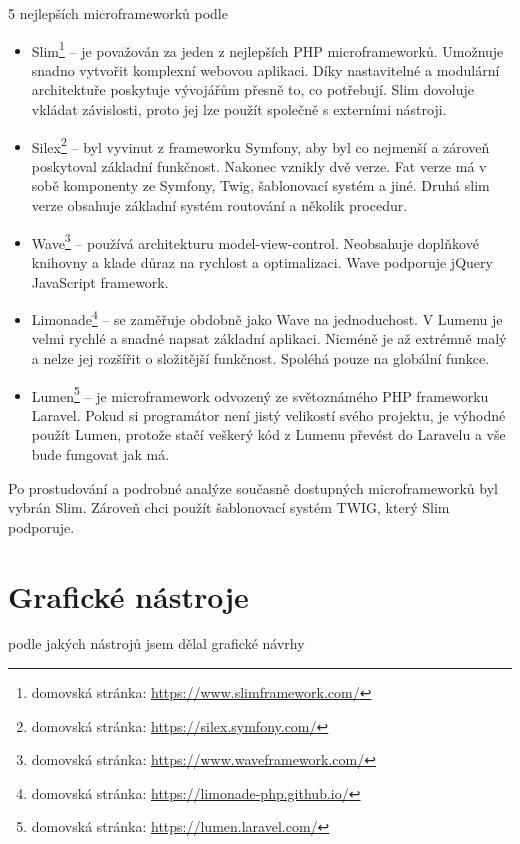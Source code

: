             5 nejlepších microframeworků podle \cite{microframeworks}
            
            \begin{itemize}
                \item Slim\footnote{domovská stránka: \url{https://www.slimframework.com/}} – je považován za jeden z nejlepších PHP microframeworků. Umožnuje snadno vytvořit komplexní webovou aplikaci. Díky nastavitelné a modulární architektuře poskytuje vývojářům přesně to, co potřebují. Slim dovoluje vkládat závislosti, proto jej lze použít společně s externími nástroji.
                \item Silex\footnote{domovská stránka: \url{https://silex.symfony.com/}} – byl vyvinut z frameworku Symfony, aby byl co nejmenší a zároveň poskytoval základní funkčnost. Nakonec vznikly dvě verze. Fat verze má v sobě komponenty ze Symfony, Twig, šablonovací systém a jiné. Druhá slim verze obsahuje základní systém routování a několik procedur. 
                \item Wave\footnote{domovská stránka: \url{https://www.waveframework.com/}} – používá architekturu model-view-control. Neobsahuje doplňkové knihovny a klade důraz na rychlost a optimalizaci. Wave podporuje jQuery JavaScript framework.
                \item Limonade\footnote{domovská stránka: \url{https://limonade-php.github.io/}} – se zaměřuje obdobně jako Wave na jednoduchost. V Lumenu je velmi rychlé a snadné napsat základní aplikaci. Nicméně je až extrémně malý a nelze jej rozšířit o složitější funkčnost. Spoléhá pouze na globální funkce.
                \item Lumen\footnote{domovská stránka: \url{https://lumen.laravel.com/}} – je microframework odvozený ze světoznámého PHP frameworku Laravel. Pokud si programátor není jistý velikostí svého projektu, je výhodné použít Lumen, protože stačí veškerý kód z Lumenu převést do Laravelu a vše bude fungovat jak má.
            \end{itemize}
        
        Po prostudování a podrobné analýze současně dostupných microframeworků byl vybrán Slim. Zároveň chci použít šablonovací systém TWIG, který Slim podporuje.
        
    \section{Grafické nástroje}
        podle jakých nástrojů jsem dělal grafické návrhy
